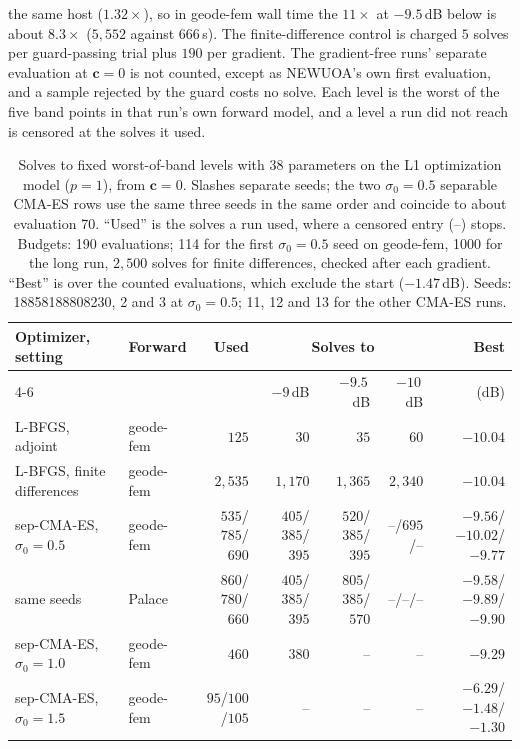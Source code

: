 \documentclass{anvil-paper}
\begin{document}
the same host ($1.32\times$), so in geode-fem wall time the $11\times$ at
$-9.5$\,dB below is about $8.3\times$ ($5{,}552$ against $666$\,s). The
finite-difference control is
charged $5$ solves per guard-passing trial plus $190$ per gradient. The
gradient-free runs' separate evaluation at $\mathbf{c} = 0$ is not counted,
except as NEWUOA's own first evaluation, and a sample rejected by the guard
costs no solve. Each level is the worst of the five band points in that
run's own forward model, and a level a run did not reach is censored at the
solves it used.
\begin{table}[t]
  \centering
  \caption{Solves to fixed worst-of-band levels with 38 parameters on the L1
  optimization model ($p = 1$), from $\mathbf{c} = 0$. Slashes separate
  seeds; the two $\sigma_0 = 0.5$ separable CMA-ES rows use the same three
  seeds in the same order and coincide to about evaluation 70. ``Used'' is
  the solves a run used, where a censored entry (--) stops. Budgets: 190
  evaluations; 114 for the first $\sigma_0 = 0.5$ seed on geode-fem, 1000
  for the long run, $2{,}500$ solves for finite differences, checked after
  each gradient. ``Best'' is over the counted evaluations, which exclude the
  start ($-1.47$\,dB). Seeds: 18858188808230, 2 and 3 at $\sigma_0 = 0.5$;
  11, 12 and 13 for the other CMA-ES runs.}
  \label{tab:baselines}
  \footnotesize
  \setlength{\tabcolsep}{3pt}
  \begin{tabular}{@{}l l r r r r r@{}}
    \toprule
    Optimizer, setting & Forward & Used & \multicolumn{3}{c}{Solves to} & Best \\
    \cmidrule(lr){4-6}
    & & & $-9$\,dB & $-9.5$\,dB & $-10$\,dB & (dB) \\
    \midrule
    L-BFGS, adjoint & geode-fem & $125$ & $30$ & $35$ & $60$ & $-10.04$ \\
    L-BFGS, finite differences & geode-fem & $2{,}535$ & $1{,}170$ & $1{,}365$ & $2{,}340$ & $-10.04$ \\
    \midrule
    sep-CMA-ES, $\sigma_0 = 0.5$ & geode-fem & $535$/$785$/$690$ & $405$/$385$/$395$ & $520$/$385$/$395$ & --/$695$/-- & $-9.56$/$-10.02$/$-9.77$ \\
    \quad same seeds & Palace & $860$/$780$/$660$ & $405$/$385$/$395$ & $805$/$385$/$570$ & --/--/-- & $-9.58$/$-9.89$/$-9.90$ \\
    sep-CMA-ES, $\sigma_0 = 1.0$ & geode-fem & $460$ & $380$ & -- & -- & $-9.29$ \\
    sep-CMA-ES, $\sigma_0 = 1.5$ & geode-fem & $95$/$100$/$105$ & -- & -- & -- & $-6.29$/$-1.48$/$-1.30$ \\

\end{tabular}
\end{table}
\end{document}
